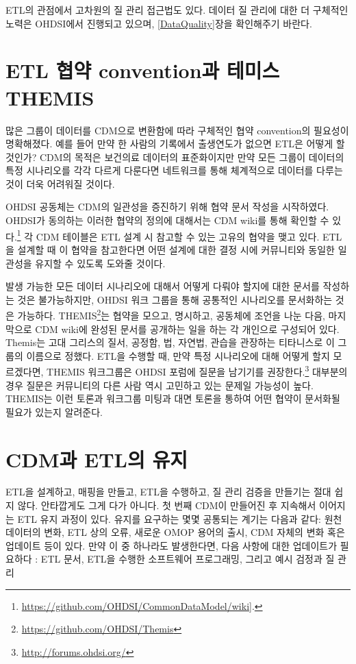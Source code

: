 \documentclass[10.5pt]{book}
\let\rmarkdownfootnote\footnote%
\def\footnote{\protect\rmarkdownfootnote}
\theoremstyle{definition}
\theoremstyle{definition}
\theoremstyle{definition}
\theoremstyle{remark}
\begin{document}
ETL의 관점에서 고차원의 질 관리 접근법도 있다. 데이터 질 관리에 대한 더
구체적인 노력은 OHDSI에서 진행되고 있으며, \ref{DataQuality}장을
확인해주기 바란다.

\section{ETL 협약 convention과 테미스
THEMIS}\label{etl--convention--themis}

많은 그룹이 데이터를 CDM으로 변환함에 따라 구체적인 협약 convention의
필요성이 명확해졌다. 예를 들어 만약 한 사람의 기록에서 출생연도가 없으면
ETL은 어떻게 할 것인가? CDM의 목적은 보건의료 데이터의 표준화이지만 만약
모든 그룹이 데이터의 특정 시나리오를 각각 다르게 다룬다면 네트워크를
통해 체계적으로 데이터를 다루는 것이 더욱 어려워질 것이다.

OHDSI 공동체는 CDM의 일관성을 증진하기 위해 협약 문서 작성을 시작하였다.
OHDSI가 동의하는 이러한 협약의 정의에 대해서는 CDM wiki를 통해 확인할 수
있다.\footnote{\url{https://github.com/OHDSI/CommonDataModel/wiki}{]}.}
각 CDM 테이블은 ETL 설계 시 참고할 수 있는 고유의 협약을 맺고 있다.
ETL을 설계할 때 이 협약을 참고한다면 어떤 설계에 대한 결정 시에
커뮤니티와 동일한 일관성을 유지할 수 있도록 도와줄 것이다.

발생 가능한 모든 데이터 시나리오에 대해서 어떻게 다뤄야 할지에 대한
문서를 작성하는 것은 불가능하지만, OHDSI 워크 그룹을 통해 공통적인
시나리오를 문서화하는 것은 가능하다. THEMIS\footnote{\url{https://github.com/OHDSI/Themis}}는
협약을 모으고, 명시하고, 공동체에 조언을 나눈 다음, 마지막으로 CDM
wiki에 완성된 문서를 공개하는 일을 하는 각 개인으로 구성되어 있다.
Themis는 고대 그리스의 질서, 공정함, 법, 자연법, 관습을 관장하는
티타니스로 이 그룹의 이름으로 정했다. ETL을 수행할 때, 만약 특정
시나리오에 대해 어떻게 할지 모르겠다면, THEMIS 워크그룹은 OHDSI 포럼에
질문을 남기기를 권장한다.\footnote{\url{http://forums.ohdsi.org/}}
대부분의 경우 질문은 커뮤니티의 다른 사람 역시 고민하고 있는 문제일
가능성이 높다. THEMIS는 이런 토론과 워크그룹 미팅과 대면 토론을 통하여
어떤 협약이 문서화될 필요가 있는지 알려준다.

\section{CDM과 ETL의 유지}\label{CDMandETLMaintenance}

ETL을 설계하고, 매핑을 만들고, ETL을 수행하고, 질 관리 검증을 만들기는
절대 쉽지 않다. 안타깝게도 그게 다가 아니다. 첫 번째 CDM이 만들어진 후
지속해서 이어지는 ETL 유지 과정이 있다. 유지를 요구하는 몇몇 공통되는
계기는 다음과 같다: 원천 데이터의 변화, ETL 상의 오류, 새로운 OMOP
용어의 출시, CDM 자체의 변화 혹은 업데이트 등이 있다. 만약 이 중
하나라도 발생한다면, 다음 사항에 대한 업데이트가 필요하다 : ETL 문서,
ETL을 수행한 소프트웨어 프로그래밍, 그리고 예시 검정과 질 관리
\end{document}
